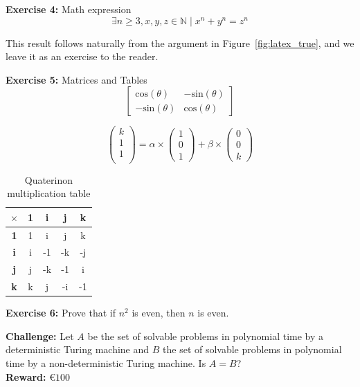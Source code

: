 \documentclass[10pt]{article}
\newcommand{\N}{\mathbb{N}}
\begin{document}
    \noindent\textbf{Exercise 4:} Math expression %
    \begin{equation}
        \exists n \geq 3, x,y,z \in \N \mid x^{n} + y^{n} = z^{n}
    \end{equation}
    
    This result follows naturally from the argument in Figure~\ref{fig:latex_true}, and we leave it as an exercise to the reader.\checkmark


    \noindent\textbf{Exercise 5:} Matrices and Tables
    $$
    \left[\begin{matrix}
    \text{cos}(\theta) & -\text{sin}(\theta)\\
    -\text{sin}(\theta) & \text{cos}(\theta)
    \end{matrix}\right]
    $$

    $$
    \begin{pmatrix}
    k \\ 1 \\ 1\\
    \end{pmatrix}
    =
    \alpha\times\begin{pmatrix}
    1 \\ 0 \\ 1
    \end{pmatrix}
    +
    \beta\times\begin{pmatrix}
    0 \\ 0 \\ k
    \end{pmatrix}
    $$


    \begin{table}[]
        \centering
        \begin{tabular}{|c|c|c|c|c|}
              \hline
             $\times$ & \textbf{1} & \textbf{i} & \textbf{j} & \textbf{k} \\
              \hline
            \textbf{1} & 1 & i & j & k \\
              \hline
            \textbf{i} & i & -1 & -k & -j \\
              \hline
            \textbf{j} & j & -k & -1 & i \\
              \hline
            \textbf{k} & k & j & -i & -1 \\
              \hline
        \end{tabular}
        \caption{Quaterinon multiplication table}
        \label{tab:my_label}
    \end{table}

    \vspace{1em}

    \noindent\textbf{Exercise 6:} Prove that if $n^{2}$ is even, then $n$ is even.
    
    \vspace{1em}
    \noindent\textbf{Challenge:} Let $A$ be the set of solvable problems in polynomial time by a deterministic Turing machine and $B$ the set of solvable problems in polynomial time by a non-deterministic Turing machine. Is $A=B$?\\
    \textbf{Reward:} \euro$100$
\end{document}
